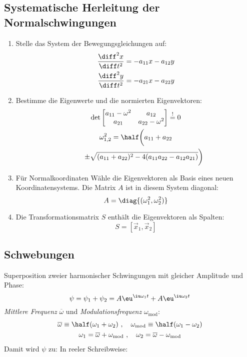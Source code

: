 	\subsection{Systematische Herleitung der Normalschwingungen} %
		\begin{enumerate}
			\item Stelle das System der Bewegungsgleichungen auf:
				\begin{align*}
					\frac{\diff^2 x}{\diff t^2} &= -a_{11}x - a_{12}y \\
					\frac{\diff^2 y}{\diff t^2} &= -a_{21}x - a_{22}y
				\end{align*}
			\item Bestimme die Eigenwerte und die normierten Eigenvektoren:
				\begin{gather*}
					\det \begin{bmatrix}
						a_{11} - \omega^2 & a_{12} \\
						a_{21} & a_{22} - \omega^2
					\end{bmatrix} \overset{!}= 0 \\
					\omega_{1,2}^2 = \half \bigg{(}a_{11} + a_{22} \\
					\qquad\  \pm \sqrt{(a_{11} + a_{22})^2 - 4(a_{11} a_{22} -
						a_{12} a_{21})}\bigg{)}
				\end{gather*}
			\item Für Normalkoordinaten Wähle die Eigenvektoren als Basis eines neuen
				Koordinatensystems. Die Matrix $A$ ist in diesem System diagonal:
				\[
					A = \diag{(\omega_1^2, \omega_2^2)}
				\]
			\item Die Transformationsmatrix $S$ enthält die Eigenvektoren als Spalten:
				\[
					S = \left[
						\vec x_1, \vec x_2
					\right]
				\]
		\end{enumerate}
	\subsection{Schwebungen} %
		Superposition zweier harmonischer Schwingungen mit gleicher Amplitude und
		Phase:
		\[
			\psi = \psi_1 + \psi_2 = A\eu^{\iu\omega_1 t} + A\eu^{\iu\omega_2 t}
		\]
		\emph{Mittlere Frequenz} $\overline\omega$ und \emph{Modulationsfrequenz}
		$\omega_\text{mod}$:
		\begin{gather*}
			\overline\omega \equiv \half (\omega_1 + \omega_2) \ ,\quad
				\omega_\text{mod} \equiv \half (\omega_1 - \omega_2) \\
			\omega_1 = \overline\omega + \omega_\text{mod} \ , \quad \omega_2 =
				\overline\omega - \omega_\text{mod}
		\end{gather*}
		Damit wird $\psi$ zu:
		In reeler Schreibweise:
		
